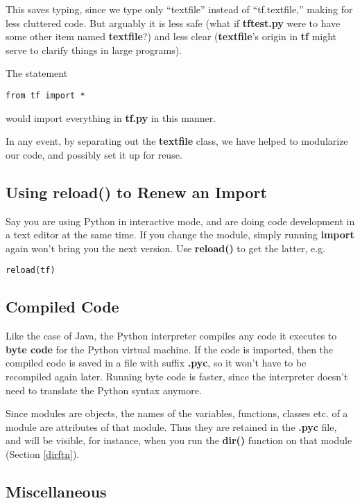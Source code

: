 This saves typing, since we type only ``textfile'' instead of
``tf.textfile,'' making for less cluttered code.  But arguably it is
less safe (what if {\bf tftest.py} were to have some other item named
{\bf textfile}?) and less clear ({\bf textfile}'s origin in {\bf tf}
might serve to clarify things in large programs).

The statement

\begin{Verbatim}[fontsize=\relsize{-2}]
from tf import *
\end{Verbatim}

would import everything in {\bf tf.py} in this manner.

In any event, by separating out the {\bf textfile} class, we have helped
to modularize our code, and possibly set it up for reuse.

\subsection{Using reload() to Renew an Import}

Say you are using Python in interactive mode, and are doing code
development in a text editor at the same time.  If you change the
module, simply running {\bf import} again won't bring you the next
version.  Use {\bf reload()} to get the latter, e.g.

\begin{Verbatim}[fontsize=\relsize{-2}]
reload(tf)
\end{Verbatim}

\subsection{Compiled Code}

Like the case of Java, the Python interpreter compiles any code it
executes to {\bf byte code} for the Python virtual machine.  If the code
is imported, then the compiled code is saved in a file with suffix {\bf
.pyc}, so it won't have to be recompiled again later.  Running byte code
is faster, since the interpreter doesn't need to translate the Python
syntax anymore.

Since modules are objects, the names of the variables, functions,
classes etc. of a module are attributes of that module.  Thus they are
retained in the {\bf .pyc} file, and will be visible, for instance, 
when you run the {\bf dir()} function on that module (Section
\ref{dirftn}).

\subsection{Miscellaneous}

